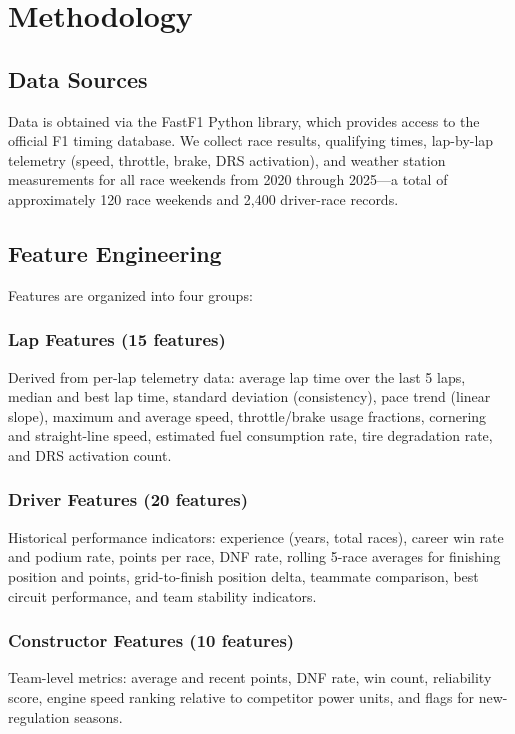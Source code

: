 \section{Methodology}
\label{sec:methodology}

\subsection{Data Sources}

Data is obtained via the FastF1 Python library, which provides access to the
official F1 timing database. We collect race results, qualifying times, lap-by-lap
telemetry (speed, throttle, brake, DRS activation), and weather station
measurements for all race weekends from 2020 through 2025—a total of approximately
120 race weekends and 2,400 driver-race records.

\subsection{Feature Engineering}

Features are organized into four groups:

\subsubsection{Lap Features (15 features)}
Derived from per-lap telemetry data: average lap time over the last 5 laps,
median and best lap time, standard deviation (consistency), pace trend (linear
slope), maximum and average speed, throttle/brake usage fractions, cornering and
straight-line speed, estimated fuel consumption rate, tire degradation rate,
and DRS activation count.

\subsubsection{Driver Features (20 features)}
Historical performance indicators: experience (years, total races), career win rate
and podium rate, points per race, DNF rate, rolling 5-race averages for finishing
position and points, grid-to-finish position delta, teammate comparison, best
circuit performance, and team stability indicators.

\subsubsection{Constructor Features (10 features)}
Team-level metrics: average and recent points, DNF rate, win count, reliability
score, engine speed ranking relative to competitor power units, and flags for
new-regulation seasons.

